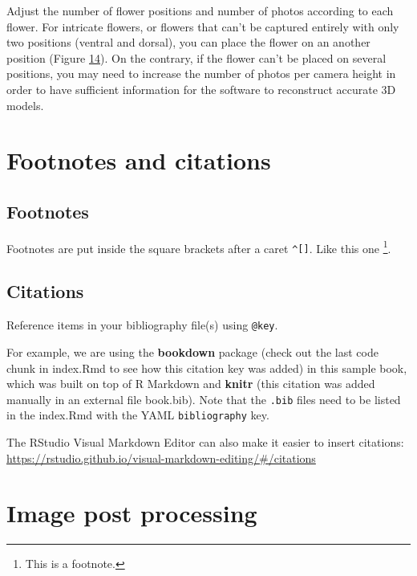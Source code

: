 \documentclass[
]{book}
\theoremstyle{definition}
\theoremstyle{definition}
\theoremstyle{definition}
\theoremstyle{definition}
\theoremstyle{remark}
\begin{document}
Adjust the number of flower positions and number of photos according to
each flower. For intricate flowers, or flowers that can't be captured
entirely with only two positions (ventral and dorsal), you can place the
flower on an another position (Figure
\protect\hyperlink{3placement}{14}). On the
contrary, if the flower can't be placed on several positions, you may
need to increase the number of photos per camera height in order to have
sufficient information for the software to reconstruct accurate 3D
models.

\hypertarget{footnotes-and-citations}{%
\chapter{Footnotes and citations}\label{footnotes-and-citations}}

\hypertarget{footnotes}{%
\section{Footnotes}\label{footnotes}}

Footnotes are put inside the square brackets after a caret \texttt{\^{}{[}{]}}. Like this one \footnote{This is a footnote.}.

\hypertarget{citations}{%
\section{Citations}\label{citations}}

Reference items in your bibliography file(s) using \texttt{@key}.

For example, we are using the \textbf{bookdown} package \citep{R-bookdown} (check out the last code chunk in index.Rmd to see how this citation key was added) in this sample book, which was built on top of R Markdown and \textbf{knitr} \citep{xie2015} (this citation was added manually in an external file book.bib).
Note that the \texttt{.bib} files need to be listed in the index.Rmd with the YAML \texttt{bibliography} key.

The RStudio Visual Markdown Editor can also make it easier to insert citations: \url{https://rstudio.github.io/visual-markdown-editing/\#/citations}

\hypertarget{image-post-processing}{%
\chapter{Image post processing}\label{image-post-processing}}
\end{document}

